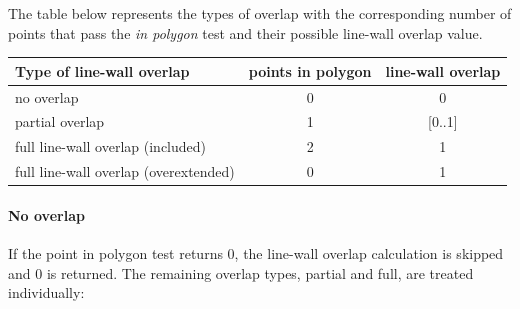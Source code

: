 \documentclass[10pt]{article}
\begin{document}
	The table below represents the types of overlap with the corresponding number of points
	that pass the \emph{in polygon} test and their possible line-wall overlap
	value.\\ 

	\begin{tabular}{|l||c|c|}
	\hline
	Type of line-wall overlap 			&	points in polygon 			& line-wall overlap \\
	\hline
	\hline
	no overlap					&	0					& 0		\\
	\hline
	partial overlap 				&	1					& [0..1]	\\
	\hline
	full line-wall overlap (included)		&	2					& 1		\\
	\hline
	full line-wall overlap (overextended)		&  	0					& 1 		\\
	\hline
	\end{tabular}

	\paragraph{No overlap}
	If the point in polygon test returns 0, the line-wall overlap calculation
	is skipped and 0 is returned. The remaining overlap types, partial and full,
	are treated individually:\\

\end{document}

